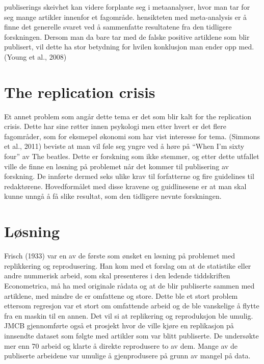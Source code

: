 \documentclass[
  12pt,
]{article}
\begin{document}
publiserings skeivhet kan videre forplante seg i metaanalyser, hvor man
tar for seg mange artikler innenfor et fagområde. hensikteten med
meta-analysis er å finne det generelle svaret ved å sammenfatte
resultatene fra den tidligere forskningen. Dersom man da bare tar med de
falske positive artiklene som blir publisert, vil dette ha stor
betydning for hvilen konklusjon man ender opp med.(Young et al., 2008)

\hypertarget{the-replication-crisis}{%
\section{The replication crisis}\label{the-replication-crisis}}

Et annet problem som angår dette tema er det som blir kalt for the
replication crisis. Dette har sine røtter innen psykologi men etter
hvert er det flere fagområder, som for eksmepel økonomi som har vist
interesse for tema. (Simmons et al., 2011) beviste at man vil føle seg
yngre ved å høre på ``When I'm sixty four'' av The beatles. Dette er
forskning som ikke stemmer, og etter dette utfallet ville de finne en
løsning på problemet når det kommer til publisering av forskning. De
innførte dermed seks ulike krav til forfatterne og fire guidelines til
redaktørene. Hovedformålet med disse kravene og guidlinesene er at man
skal kunne unngå å få slike resultat, som den tidligere nevnte
forskningen.

\hypertarget{luxf8sning}{%
\section{Løsning}\label{luxf8sning}}

Frisch (1933) var en av de første som ønsket en løsning på problemet med
replikkering og reprodusering. Han kom med et forslag om at de
statistike eller andre nummerisk arbeid, som skal presenteres i den
ledende tiddskriften Econometrica, må ha med originale rådata og at de
blir publiserte sammen med artiklene, med mindre de er omfattene og
store. Dette ble et stort problem ettersom regresjon var et stort om
omfattende arbeid og de ble vanskelige å flytte fra en maskin til en
annen. Det vil si at replikering og reproduksjon ble umulig. JMCB
gjennomførte også et prosjekt hvor de ville kjøre en replikasjon på
innsendte dataset som følgte med artikler som var blitt publiserte. De
undersøkte mer enn 70 arbeid og klarte å direkte reprodusere to av dem.
Mange av de publiserte arbeidene var umulige å gjenprodusere på grunn av
mangel på data.
\end{document}
